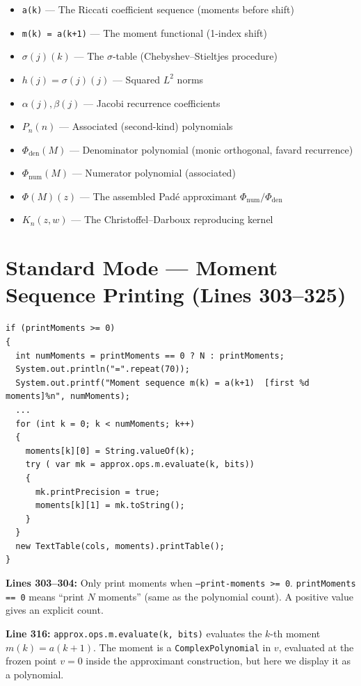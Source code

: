 \documentclass[a4paper,11pt]{article}
\begin{document}
\begin{itemize}[nosep]
\item \texttt{a(k)} --- The Riccati coefficient sequence (moments before shift)
\item \texttt{m(k) = a(k+1)} --- The moment functional (1-index shift)
\item $\sigma(j)(k)$ --- The $\sigma$-table (Chebyshev--Stieltjes procedure)
\item $h(j) = \sigma(j)(j)$ --- Squared $L^2$ norms
\item $\alpha(j), \beta(j)$ --- Jacobi recurrence coefficients
\item $P_n(n)$ --- Associated (second-kind) polynomials
\item $\Phi_{\text{den}}(M)$ --- Denominator polynomial (monic orthogonal, favard recurrence)
\item $\Phi_{\text{num}}(M)$ --- Numerator polynomial (associated)
\item $\Phi(M)(z)$ --- The assembled Pad\'e approximant $\Phi_{\text{num}} / \Phi_{\text{den}}$
\item $K_n(z,w)$ --- The Christoffel--Darboux reproducing kernel
\end{itemize}

\section{Standard Mode --- Moment Sequence Printing (Lines 303--325)}

\begin{lstlisting}[firstnumber=303]
if (printMoments >= 0)
{
  int numMoments = printMoments == 0 ? N : printMoments;
  System.out.println("=".repeat(70));
  System.out.printf("Moment sequence m(k) = a(k+1)  [first %d moments]%n", numMoments);
  ...
  for (int k = 0; k < numMoments; k++)
  {
    moments[k][0] = String.valueOf(k);
    try ( var mk = approx.ops.m.evaluate(k, bits))
    {
      mk.printPrecision = true;
      moments[k][1] = mk.toString();
    }
  }
  new TextTable(cols, moments).printTable();
}
\end{lstlisting}

\textbf{Lines 303--304:} Only print moments when \texttt{--print-moments >= 0}.
\texttt{printMoments == 0} means ``print $N$ moments'' (same as the polynomial
count). A positive value gives an explicit count.

\textbf{Line 316:} \texttt{approx.ops.m.evaluate(k, bits)} evaluates the $k$-th
moment $m(k) = a(k+1)$. The moment is a \texttt{ComplexPolynomial} in $v$,
evaluated at the frozen point $v = 0$ inside the approximant construction, but
here we display it as a polynomial.
\end{document}
